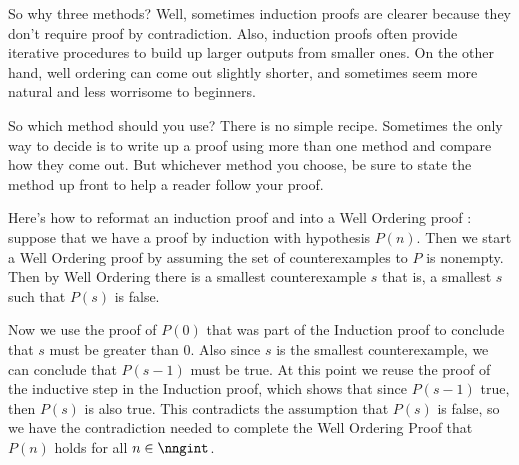 So why three methods?  Well, sometimes induction proofs are clearer
because they don't require proof by contradiction.  Also, induction
proofs often provide iterative procedures to build up larger outputs
from smaller ones.  On the other hand, well ordering can come out
slightly shorter, and sometimes seem more natural and less worrisome
to beginners.

So which method should you use?  There is no simple recipe.  Sometimes
the only way to decide is to write up a proof using more than one
method and compare how they come out.  But whichever method you
choose, be sure to state the method up front to help a reader follow
your proof.

\begin{editingnotes}
Here's how to reformat an induction proof and into a Well
Ordering proof : suppose that we have a proof by induction with
hypothesis $P(n)$.  Then we start a Well Ordering proof by assuming the
set of counterexamples to $P$ is nonempty.  Then by Well Ordering there is
a smallest counterexample $s$ that is, a smallest $s$ such that $P(s)$
is false.

Now we use the proof of $P(0)$ that was part of the Induction proof to
conclude that $s$ must be greater than 0.  Also since $s$ is the smallest
counterexample, we can conclude that $P(s-1)$ must be true.  At this point
we reuse the proof of the inductive step in the Induction proof, which
shows that since $P(s-1)$ true, then $P(s)$ is also true.  This
contradicts the assumption that $P(s)$ is false, so we have the
contradiction needed to complete the Well Ordering Proof that $P(n)$ holds
for all $n \in \nngint$.
\end{editingnotes}

\endinput

